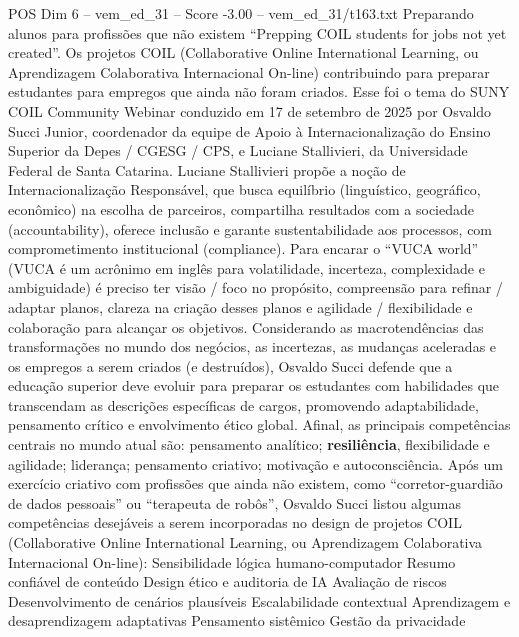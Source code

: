 \begin{textsample}{POS Dim 6 – vem\_ed\_31 – Score -3.00 – vem\_ed\_31/t163.txt}  \label{ex:f6_pos_060}
Preparando alunos para profissões que não existem “Prepping COIL students for jobs not yet created”.
Os projetos COIL (Collaborative Online International Learning, ou Aprendizagem Colaborativa Internacional On-line) contribuindo para preparar estudantes para empregos que ainda não foram criados.
Esse foi o tema do SUNY COIL Community Webinar conduzido em 17 de setembro de 2025 por Osvaldo Succi Junior, coordenador da equipe de Apoio à Internacionalização do Ensino Superior da Depes / CGESG / CPS, e Luciane Stallivieri, da Universidade Federal de Santa Catarina.
Luciane Stallivieri propõe a noção de Internacionalização Responsável, que busca equilíbrio (linguístico, geográfico, econômico) na escolha de parceiros, compartilha resultados com a sociedade (accountability), oferece inclusão e garante sustentabilidade aos processos, com comprometimento institucional (compliance).
Para encarar o “VUCA world” (VUCA é um acrônimo em inglês para volatilidade, incerteza, complexidade e ambiguidade) é preciso ter visão / foco no propósito, compreensão para refinar / adaptar planos, clareza na criação desses planos e agilidade / flexibilidade e colaboração para alcançar os objetivos.
Considerando as macrotendências das transformações no mundo dos negócios, as incertezas, as mudanças aceleradas e os empregos a serem criados (e destruídos), Osvaldo Succi defende que a educação superior deve evoluir para preparar os estudantes com habilidades que transcendam as descrições específicas de cargos, promovendo adaptabilidade, pensamento crítico e envolvimento ético global.
Afinal, as principais competências centrais no mundo atual são: pensamento analítico; \textbf{resiliência}, flexibilidade e agilidade; liderança; pensamento criativo; motivação e autoconsciência.
Após um exercício criativo com profissões que ainda não existem, como “corretor-guardião de dados pessoais” ou “terapeuta de robôs”, Osvaldo Succi listou algumas competências desejáveis a serem incorporadas no design de projetos COIL (Collaborative Online International Learning, ou Aprendizagem Colaborativa Internacional On-line): Sensibilidade lógica humano-computador Resumo confiável de conteúdo Design ético e auditoria de IA Avaliação de riscos Desenvolvimento de cenários plausíveis Escalabilidade contextual Aprendizagem e desaprendizagem adaptativas Pensamento sistêmico Gestão da privacidade

\end{textsample}
